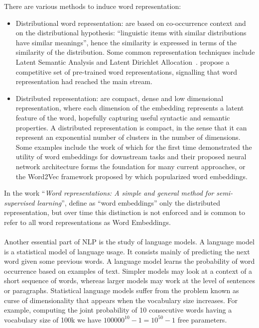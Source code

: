 There are various methods to induce word representation:

\begin{itemize}[itemsep = 0.1em]
\item Distributional word representation: are based on co-occurrence context and on the distributional hypothesis:  ``linguistic items with similar distributions have similar meanings'', hence the similarity is expressed in terms of the similarity of the distribution. Some common representation techniques include Latent Semantic Analysis and Latent Dirichlet Allocation~\citep{bei2003lda, das-etal-2015-gaussian}. \citet{pennington2014glove} propose a competitive set of pre-trained word representations, signalling that word representation had reached the main stream.

\item Distributed representation: are compact, dense and low dimensional representation, where each dimension of the embedding represents a latent feature of the word, hopefully capturing useful syntactic and semantic properties. A distributed representation is compact, in the sense that it can represent an exponential number of clusters in the number of dimensions. Some examples include the work of \citet{Collobert2008} which for the first time demonstrated the utility of word embeddings for downstream tasks and their proposed neural network architecture forms the foundation for many current approaches, or the Word2Vec framework proposed by \citet{mikolov2013distributed} which popularized word embeddings.
\end{itemize}

In the work ``\textit{Word representations: A simple and general method for semi-supervised learning}'', \citet{turian2010word} define as ``word embeddings'' only the distributed representation, but over time this distinction is not enforced and is common to refer to all word representations as Word Embeddings.


\paragraph{}
Another essential part of NLP is the study of language models. A language model is a statistical model of language usage. It consists mainly of predicting the next word given some previous words. A language model learns the probability of word occurrence based on examples of text. Simpler models may look at a context of a short sequence of words, whereas larger models may work at the level of sentences or paragraphs. Statistical language models suffer from the problem known as curse of dimensionality that appears when the vocabulary size increases. For example, computing the joint probability of 10 consecutive words having a vocabulary size of 100k we have $100000^{10} - 1 = 10^{50} - 1$ free parameters.

